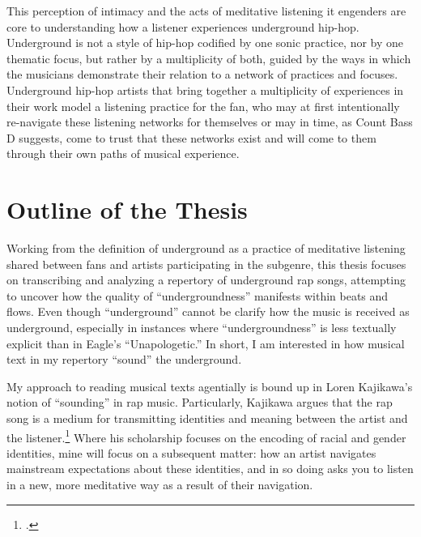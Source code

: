 This perception of intimacy and the acts of meditative listening it engenders are core to understanding how a listener
experiences underground hip-hop. Underground is not a style of hip-hop codified by one sonic practice, nor by one thematic
focus, but rather by a multiplicity of both, guided by the ways in which the musicians demonstrate their relation to a
network of practices and focuses. Underground hip-hop artists that bring together a multiplicity of experiences in their
work model a listening practice for the fan, who may at first intentionally re-navigate these listening networks for themselves
or may in time, as Count Bass D suggests, come to trust that these networks exist and will come to them through their own paths
of musical experience.


\section{Outline of the Thesis}

Working from the definition of underground as a practice of meditative listening shared between fans and artists 
participating in the subgenre, this thesis focuses on transcribing and analyzing a repertory of underground rap songs, 
attempting to uncover how the quality of ``undergroundness'' manifests within beats and flows. Even though ``underground''
cannot be clarify how  the music is received as underground, especially in instances where ``undergroundness'' is less 
textually explicit than in Eagle's ``Unapologetic.'' In short, I am interested in how musical text in my repertory 
``sound'' the underground.

My approach to reading musical texts agentially is bound up in Loren Kajikawa's notion of ``sounding'' in rap music. 
Particularly, Kajikawa argues that the rap song is a medium for transmitting identities and meaning between the artist
and the listener.\footnote{
    \autocite[2]{lorenkajikawaSoundingRaceRap2015}.}
Where his scholarship focuses on the encoding of racial and gender identities, mine will focus on a subsequent matter:
how an artist navigates mainstream expectations about these identities, and in so doing asks you to listen in a new, more
meditative way as a result of their navigation.

